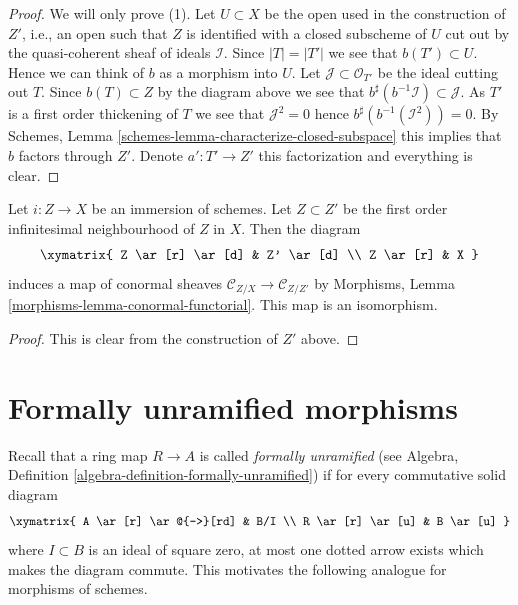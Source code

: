 \begin{proof}
We will only prove (1).
Let $U \subset X$ be the open used in the construction of $Z'$, i.e., an
open such that $Z$ is identified with a closed subscheme of $U$ cut out by
the quasi-coherent sheaf of ideals $\mathcal{I}$.
Since $|T| = |T'|$ we see that $b(T') \subset U$. Hence we can
think of $b$ as a morphism into $U$. Let $\mathcal{J} \subset \mathcal{O}_{T'}$
be the ideal cutting out $T$. Since $b(T) \subset Z$ by the diagram above
we see that $b^\sharp(b^{-1}\mathcal{I}) \subset \mathcal{J}$. As
$T'$ is a first order thickening of $T$ we see that $\mathcal{J}^2 = 0$
hence $b^\sharp(b^{-1}(\mathcal{I}^2)) = 0$. By
Schemes, Lemma \ref{schemes-lemma-characterize-closed-subspace}
this implies that $b$ factors through $Z'$. Denote $a' : T' \to Z'$
this factorization and everything is clear.
\end{proof}

\begin{lemma}
\label{lemma-infinitesimal-neighbourhood-conormal}
Let $i : Z \to X$ be an immersion of schemes. Let $Z \subset Z'$ be
the first order infinitesimal neighbourhood of $Z$ in $X$.
Then the diagram
$$
\xymatrix{
Z \ar[r] \ar[d] & Z' \ar[d] \\
Z \ar[r] & X
}
$$
induces a map of conormal sheaves $\mathcal{C}_{Z/X} \to \mathcal{C}_{Z/Z'}$ by
Morphisms, Lemma \ref{morphisms-lemma-conormal-functorial}.
This map is an isomorphism.
\end{lemma}

\begin{proof}
This is clear from the construction of $Z'$ above.
\end{proof}
















\section{Formally unramified morphisms}
\label{section-formally-unramified}

\noindent
Recall that a ring map $R \to A$ is called {\it formally unramified}
(see Algebra, Definition \ref{algebra-definition-formally-unramified})
if for every commutative solid diagram
$$
\xymatrix{
A \ar[r] \ar@{-->}[rd] & B/I \\
R \ar[r] \ar[u] & B \ar[u]
}
$$
where $I \subset B$ is an ideal of square zero, at most one dotted
arrow exists which makes the diagram commute. This motivates
the following analogue for morphisms of schemes.

